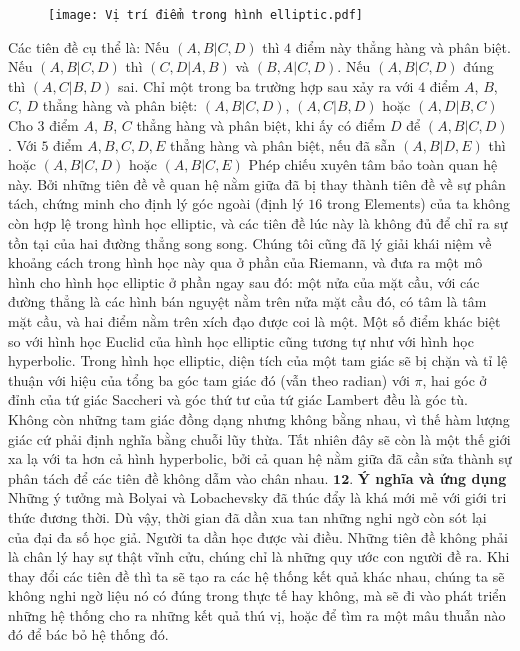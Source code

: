 \begin{multicols}{2}
	\begin{figure}[H]
		\vspace*{-5pt}
		\centering
		\captionsetup{labelformat= empty, justification=centering}
		\texttt{[image: Vị trí điểm trong hình elliptic.pdf]}
		\vspace*{-10pt}
	\end{figure}
	Các tiên đề cụ thể là:
	Nếu $(A, B | C, D)$ thì $4$ điểm này thẳng hàng và phân biệt.
	\vskip 0.1cm
	Nếu $(A, B | C, D)$ thì $(C, D | A, B)$ và $(B, A | C, D)$.
	\vskip 0.1cm
	Nếu $(A, B | C, D)$ đúng thì $(A, C | B, D)$ sai.
	\vskip 0.1cm
	Chỉ một trong ba trường hợp sau xảy ra với $4$ điểm $A$, $B$, $C$, $D$ thẳng hàng và phân biệt: $(A, B | C, D)$, $(A, C | B, D)$ hoặc $(A, D | B, C)$
	\vskip 0.1cm
	Cho $3$ điểm $A$, $B$, $C$ thẳng hàng và phân biệt, khi ấy có điểm $D$ để $(A, B | C, D)$.
	\vskip 0.1cm
	Với $5$ điểm $A, B, C, D, E$ thẳng hàng và phân biệt, nếu đã sẵn $(A, B | D, E)$ thì hoặc $(A, B | C, D)$ hoặc $(A, B | C, E)$
	Phép chiếu xuyên tâm bảo toàn quan hệ này.
	\vskip 0.1cm
	Bởi những tiên đề về quan hệ nằm giữa đã bị thay thành tiên đề về sự phân tách, chứng minh cho định lý góc ngoài (định lý $16$ trong Elements) của ta không còn hợp lệ trong hình học elliptic, và các  tiên đề lúc này là không đủ để chỉ ra sự tồn tại của hai đường thẳng song song. 
	\vskip 0.1cm
	Chúng tôi cũng đã lý giải khái niệm về khoảng cách trong hình học này qua ở phần của Riemann, và đưa ra một mô hình cho hình học elliptic ở phần ngay sau đó: một nửa của mặt cầu, với các đường thẳng là các hình bán nguyệt nằm trên nửa mặt cầu đó, có tâm là tâm mặt cầu, và hai điểm nằm trên xích đạo được coi là một. 
	\vskip 0.1cm
	Một số điểm khác biệt so với hình học Euclid của hình học elliptic cũng tương tự như với hình học hyperbolic. Trong hình học elliptic, diện tích của một tam giác sẽ bị chặn và tỉ lệ thuận với hiệu của tổng ba góc tam giác đó (vẫn theo radian) với $\pi$, hai góc ở đỉnh của tứ giác Saccheri và góc thứ tư của tứ giác Lambert đều là góc tù. Không còn những tam giác đồng dạng nhưng không bằng nhau, vì thế hàm lượng giác cứ phải định nghĩa bằng chuỗi lũy thừa. Tất nhiên đây sẽ còn là một thế giới xa lạ với ta hơn cả hình hyperbolic, bởi cả quan hệ nằm giữa đã cần sửa thành sự phân tách để các tiên đề không dẫm vào chân nhau. 
	\vskip 0.1cm
	$\pmb{12.}$ \textbf{\color{lichsutoanhoc}Ý nghĩa và ứng dụng}
	\vskip 0.1cm
	Những ý tưởng mà Bolyai và Lobachevsky đã thúc đẩy là khá mới mẻ với giới tri thức đương thời. Dù vậy, thời gian đã dần xua tan những nghi ngờ còn sót lại của đại đa số học giả. Người ta dần học được vài điều. Những tiên đề không phải là chân lý hay sự thật vĩnh cửu, chúng chỉ là những quy ước con người đề ra. Khi thay đổi các tiên đề thì ta sẽ tạo ra các hệ thống kết quả khác nhau, chúng ta sẽ không nghi ngờ liệu nó có đúng trong thực tế hay không, mà sẽ đi vào phát triển những hệ thống cho ra những kết quả thú vị, hoặc để tìm ra một mâu thuẫn nào đó để bác bỏ hệ thống đó.

\end{multicols}
